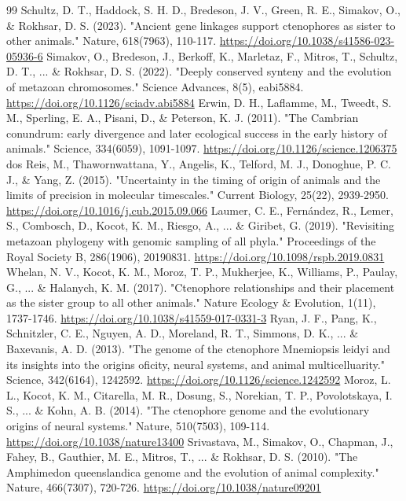 \documentclass[10pt,letterpaper]{article}
\begin{document}
\begin{thebibliography}{99}
 Schultz, D. T., Haddock, S. H. D., Bredeson, J. V., Green, R. E., Simakov, O., \& Rokhsar, D. S. (2023). "Ancient gene linkages support ctenophores as sister to other animals." Nature, 618(7963), 110-117. \url{https://doi.org/10.1038/s41586-023-05936-6}
 Simakov, O., Bredeson, J., Berkoff, K., Marletaz, F., Mitros, T., Schultz, D. T., ... \& Rokhsar, D. S. (2022). "Deeply conserved synteny and the evolution of metazoan chromosomes." Science Advances, 8(5), eabi5884. \url{https://doi.org/10.1126/sciadv.abi5884}
 Erwin, D. H., Laflamme, M., Tweedt, S. M., Sperling, E. A., Pisani, D., \& Peterson, K. J. (2011). "The Cambrian conundrum: early divergence and later ecological success in the early history of animals." Science, 334(6059), 1091-1097. \url{https://doi.org/10.1126/science.1206375}
 dos Reis, M., Thawornwattana, Y., Angelis, K., Telford, M. J., Donoghue, P. C. J., \& Yang, Z. (2015). "Uncertainty in the timing of origin of animals and the limits of precision in molecular timescales." Current Biology, 25(22), 2939-2950. \url{https://doi.org/10.1016/j.cub.2015.09.066}
 Laumer, C. E., Fernández, R., Lemer, S., Combosch, D., Kocot, K. M., Riesgo, A., ... \& Giribet, G. (2019). "Revisiting metazoan phylogeny with genomic sampling of all phyla." Proceedings of the Royal Society B, 286(1906), 20190831. \url{https://doi.org/10.1098/rspb.2019.0831}
 Whelan, N. V., Kocot, K. M., Moroz, T. P., Mukherjee, K., Williams, P., Paulay, G., ... \& Halanych, K. M. (2017). "Ctenophore relationships and their placement as the sister group to all other animals." Nature Ecology \& Evolution, 1(11), 1737-1746. \url{https://doi.org/10.1038/s41559-017-0331-3}
 Ryan, J. F., Pang, K., Schnitzler, C. E., Nguyen, A. D., Moreland, R. T., Simmons, D. K., ... \& Baxevanis, A. D. (2013). "The genome of the ctenophore Mnemiopsis leidyi and its insights into the origins oficity, neural systems, and animal multicelluarity." Science, 342(6164), 1242592. \url{https://doi.org/10.1126/science.1242592}
 Moroz, L. L., Kocot, K. M., Citarella, M. R., Dosung, S., Norekian, T. P., Povolotskaya, I. S., ... \& Kohn, A. B. (2014). "The ctenophore genome and the evolutionary origins of neural systems." Nature, 510(7503), 109-114. \url{https://doi.org/10.1038/nature13400}
 Srivastava, M., Simakov, O., Chapman, J., Fahey, B., Gauthier, M. E., Mitros, T., ... \& Rokhsar, D. S. (2010). "The Amphimedon queenslandica genome and the evolution of animal complexity." Nature, 466(7307), 720-726. \url{https://doi.org/10.1038/nature09201}

\end{thebibliography}
\end{document}
